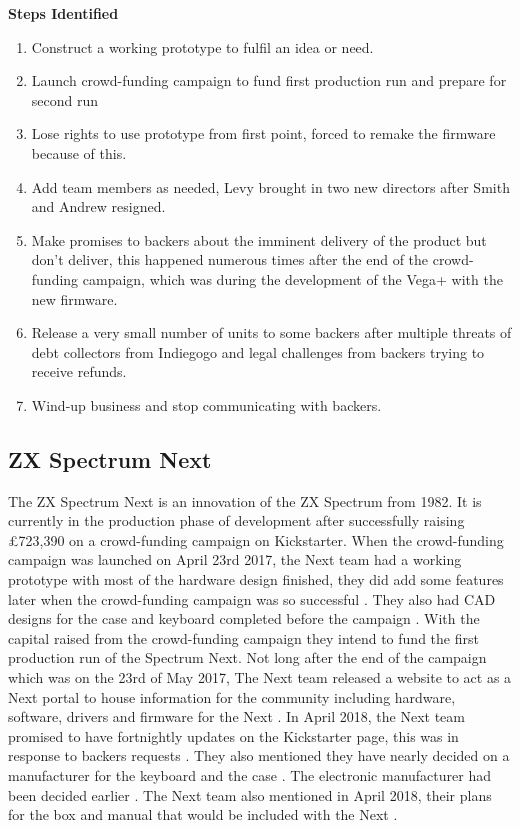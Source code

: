 \textbf{Steps Identified}\\
\begin{enumerate}
\item Construct a working prototype to fulfil an idea or need.
\item Launch crowd-funding campaign to fund first production run and prepare for second run
\item Lose rights to use prototype from first point, forced to remake the firmware because of this.
\item Add team members as needed, Levy brought in two new directors after Smith and Andrew resigned.
\item Make promises to backers about the imminent delivery of the product but don't deliver, this happened numerous times after the end of the crowd-funding campaign, which was during the development of the Vega+ with the new firmware.
\item Release a very small number of units to some backers after multiple threats of debt collectors from Indiegogo and legal challenges from backers trying to receive refunds.
\item Wind-up business and stop communicating with backers.
\end{enumerate} 



\subsection{ZX Spectrum Next}
The ZX Spectrum Next is an innovation of the ZX Spectrum from 1982. It is currently in the production phase of development after successfully raising \pounds 723,390 on a crowd-funding campaign on Kickstarter. When the crowd-funding campaign was launched on April 23rd 2017, the Next team had a working prototype with most of the hardware design finished, they did add some features later when the crowd-funding campaign was so successful \cite{RN151}. They also had CAD designs for the case and keyboard completed before the campaign \cite{RN149}. With the capital raised from the crowd-funding campaign they intend to fund the first production run of the Spectrum Next. Not long after the end of the campaign which was on the 23rd of May 2017, The Next team released a website to act as a Next portal to house information for the community including hardware, software, drivers and firmware for the Next 
\cite{RN154}. In April 2018, the Next team promised to have fortnightly updates on the Kickstarter page, this was in response to backers requests \cite{RN155}. They also mentioned they have nearly decided on a manufacturer for the keyboard and the case 
\cite{RN155}. The electronic manufacturer had been decided earlier \cite{RN151}. The Next team also mentioned in April 2018, their plans for the box and manual that would be included with the Next \cite{RN151}.


